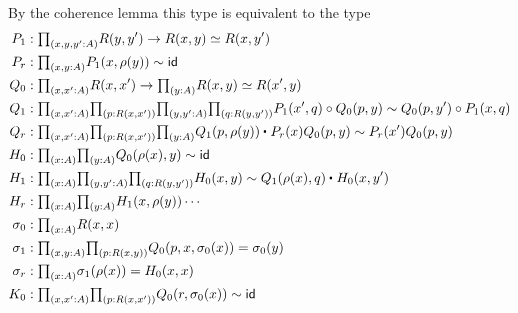 By the coherence lemma this type is equivalent to the type
\begin{align*}
P_1 & : \prd{x,y,y':A} R(y,y')\to R(x,y) \simeq R(x,y') \\
P_r & : \prd{x,y:A} P_1(x,\rho(y))\htpy \idfunc \\
Q_0 & : \prd{x,x':A} R(x,x')\to \prd{y:A} R(x,y) \simeq R(x',y) \\
Q_1 & : \prd{x,x':A}{p:R(x,x')}{y,y':A}{q:R(y,y')} P_1(x',q)\circ Q_0(p,y)\htpy Q_0(p,y')\circ P_1(x,q) \\
Q_r & : \prd{x,x':A}{p:R(x,x')}{y:A} \ct{Q_1(p,\rho(y))}{P_r(x)Q_0(p,y)} \htpy P_r(x')Q_0(p,y) \\
H_0 & : \prd{x:A}{y:A} Q_0(\rho(x),y)\htpy \idfunc \\
H_1 & : \prd{x:A}{y,y':A}{q:R(y,y')} H_0(x,y)\htpy \ct{Q_1(\rho(x),q)}{H_0(x,y')} \\
H_r & : \prd{x:A}{y:A} H_1(x,\rho(y)) \cdots \\
\sigma_0 & : \prd{x:A} R(x,x) \\
\sigma_1 & : \prd{x,y:A}{p:R(x,y)} Q_0(p,x,\sigma_0(x))=\sigma_0(y) \\
\sigma_r & : \prd{x:A} \sigma_1(\rho(x))= H_0(x,x) \\
K_0 & : \prd{x,x':A}{p:R(x,x')} Q_0(r,\sigma_0(x))\htpy \idfunc
\end{align*}

